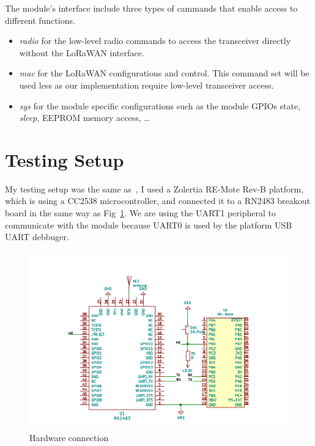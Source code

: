 

The module's interface include three types of cammands that enable access to
different functions.

\begin{itemize}
  \item \emph{radio} for the low-level radio commands to access the transceiver
    directly without the LoRaWAN interface.
  \item \emph{mac} for the LoRaWAN configurations and control. This command set
    will be used less as our implementation require low-level transceiver
    access.
  \item \emph{sys} for the module specific configurations such as the module
    GPIOs state, \emph{sleep}, EEPROM memory access, \ldots
\end{itemize}

\section{Testing Setup}

My testing setup was the same as~\cite{8847137}, I used a Zolertia RE-Mote
Rev-B platform, which is using a CC2538 microcontroller, and connected it to a
RN2483 breakout board in the same way as Fig~\ref{fig:schemaconn}. 
We are using the UART1 peripheral to communicate with the module because UART0
is used by the platform USB UART debbuger.

\begin{figure}[H]
  \centering
  \includegraphics[scale=0.70]{thesis.tex/chapters/driver/fig/conn_diag.pdf}
  \caption{Hardware connection\label{fig:schemaconn}}
\end{figure}

